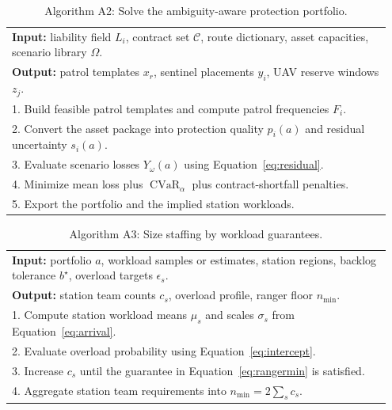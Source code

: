 \begin{table}[H]
\centering
\caption{Algorithm A2: Solve the ambiguity-aware protection portfolio.}
\label{alg:app_barrier}
\begin{tabular}{p{0.95\linewidth}}
\toprule
\textbf{Input:} liability field \(L_i\), contract set \(\mathcal{C}\), route dictionary, asset capacities, scenario library \(\Omega\). \\
\textbf{Output:} patrol templates \(x_r\), sentinel placements \(y_i\), UAV reserve windows \(z_j\). \\
\midrule
1. Build feasible patrol templates and compute patrol frequencies \(F_i\). \\
2. Convert the asset package into protection quality \(p_i(a)\) and residual uncertainty \(s_i(a)\). \\
3. Evaluate scenario losses \(Y_\omega(a)\) using Equation~\eqref{eq:residual}. \\
4. Minimize mean loss plus \(\operatorname{CVaR}_\alpha\) plus contract-shortfall penalties. \\
5. Export the portfolio and the implied station workloads. \\
\bottomrule
\end{tabular}
\end{table}

\begin{table}[H]
\centering
\caption{Algorithm A3: Size staffing by workload guarantees.}
\label{alg:app_queue}
\begin{tabular}{p{0.95\linewidth}}
\toprule
\textbf{Input:} portfolio \(a\), workload samples or estimates, station regions, backlog tolerance \(b^\star\), overload targets \(\epsilon_s\). \\
\textbf{Output:} station team counts \(c_s\), overload profile, ranger floor \(n_{\min}\). \\
\midrule
1. Compute station workload means \(\mu_s\) and scales \(\sigma_s\) from Equation~\eqref{eq:arrival}. \\
2. Evaluate overload probability using Equation~\eqref{eq:intercept}. \\
3. Increase \(c_s\) until the guarantee in Equation~\eqref{eq:rangermin} is satisfied. \\
4. Aggregate station team requirements into \(n_{\min}=2\sum_s c_s\). \\
\bottomrule
\end{tabular}
\end{table}

